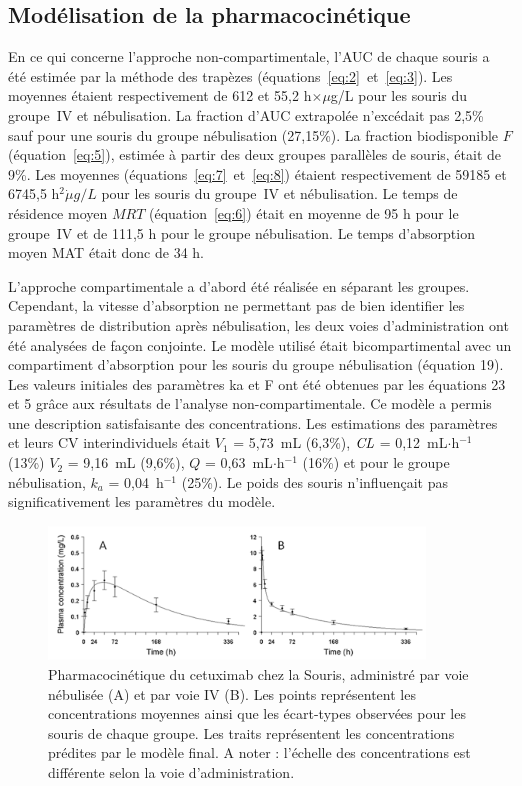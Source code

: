 \subsection{Modélisation de la pharmacocinétique}
En ce qui concerne l'approche non-compartimentale, l'\gls{AUC} de chaque souris a été estimée par la méthode des trapèzes (équations~\ref{eq:2}~et~\ref{eq:3}). Les moyennes étaient respectivement de 612 et 55,2 h$\times \mu$g/L pour les souris du groupe~\gls{IV} et nébulisation. La fraction d'\gls{AUC} extrapolée n'excédait pas 2,5\% sauf pour une souris du groupe nébulisation (27,15\%). La fraction biodisponible $F$ (équation~\ref{eq:5}), estimée à partir des deux groupes parallèles de souris, était de 9\%. Les moyennes (équations~\ref{eq:7}~et~\ref{eq:8}) étaient respectivement de 59185 et 6745,5 h$^2\dot \mu g/L$ pour les souris du groupe~\gls{IV} et nébulisation. Le temps de résidence moyen $MRT$ (équation~\ref{eq:6}) était en moyenne de 95 h pour le groupe~\gls{IV} et de 111,5 h pour le groupe nébulisation. Le temps d'absorption moyen MAT était donc de 34 h. 

L'approche compartimentale a d'abord été réalisée en séparant les groupes. Cependant, la vitesse d'absorption ne permettant pas de bien identifier les paramètres de distribution après nébulisation, les deux voies d'administration ont été analysées de façon conjointe. Le modèle utilisé était bicompartimental avec un compartiment d'absorption pour les souris du groupe nébulisation (équation 19). Les valeurs initiales des paramètres ka et F ont été obtenues par les équations 23 et 5 grâce aux résultats de l'analyse non-compartimentale. Ce modèle a permis une description satisfaisante des concentrations. Les estimations des paramètres et leurs CV interindividuels était $V_1$ = 5,73~mL (6,3\%), $\operatorname{\textit{CL}}$ = 0,12~mL$\cdot$h$^{-1}$ (13\%) $V_2$ = 9,16~mL (9,6\%), $Q$ = 0,63~mL$\cdot$h$^{-1}$ (16\%) et pour le groupe nébulisation, $k_a$ = 0,04~h$^{-1}$ (25\%). Le poids des souris n'influençait pas significativement les paramètres du modèle.
\begin{figure}[htbp]
	\centering
		\includegraphics[width=10cm]{figures/raster/FIG_33}
	\caption{Pharmacocinétique du cetuximab chez la Souris, administré par voie nébulisée (A) et par voie \gls{IV} (B). Les points représentent les concentrations moyennes ainsi que les écart-types observées pour les souris de chaque groupe. Les traits représentent les concentrations prédites par le modèle final. A noter : l'échelle des concentrations est différente selon la voie d'administration.}
	\label{fig:33}
\end{figure}

